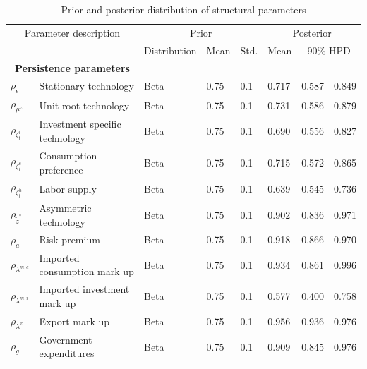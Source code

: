 \documentclass[12pt,oneside,a4paper]{article}
\begin{document}
\begin{table}[H]
\centering
\caption{Prior and posterior distribution of structural parameters}
\label{table:prior_posterior_structural_shocks}
\begin{tabular}{llllllll}
\hline
\multicolumn{2}{c}{Parameter description}                            & \multicolumn{3}{c}{Prior} & \multicolumn{3}{c}{Posterior}         \\
                &                                        & Distribution    & Mean    & Std.    & Mean    & \multicolumn{2}{c}{90\% HPD}  \\
\hline       
\multicolumn{2}{c}{\textbf{Persistence parameters}}      &                 &         &        &         &           &        \\
$\rho_{\epsilon}$     & Stationary technology                  & Beta            & 0.75    & 0.1    & 0.717  & 0.587    & 0.849 \\
$\rho_{\mu^{z}}$        & Unit root technology                   & Beta            & 0.75    & 0.1    & 0.731  & 0.586    & 0.879 \\
$\rho_{\zeta_{t}^{i}}$           & Investment specific technology         & Beta            & 0.75    & 0.1    & 0.690  & 0.556    & 0.827 \\
$\rho_{\zeta_{t}^{c}}$           & Consumption preference                 & Beta            & 0.75    & 0.1    & 0.715  & 0.572    & 0.865 \\
$\rho_{\zeta_{t}^{h}}$           & Labor supply                           & Beta            & 0.75    & 0.1    & 0.639  & 0.545    & 0.736 \\
$\rho_{\tilde{z}^{*}}$         & Asymmetric technology                  & Beta            & 0.75    & 0.1    & 0.902  & 0.836    & 0.971 \\
$\rho_a$           & Risk premium                           & Beta            & 0.75    & 0.1    & 0.918  & 0.866    & 0.970 \\
$\rho_{\lambda^{m,c}}$    & Imported consumption mark up           & Beta            & 0.75    & 0.1    & 0.934  & 0.861    & 0.996 \\
$\rho_{\lambda^{m,i}}$    & Imported investment mark up            & Beta            & 0.75    & 0.1    & 0.577  & 0.400   & 0.758 \\
$\rho_{\lambda^{x}}$     & Export mark up                         & Beta            & 0.75    & 0.1    & 0.956  & 0.936    & 0.976 \\
$\rho_{g}$         & Government expenditures                 & Beta            & 0.75    & 0.1    & 0.909  & 0.845    & 0.976 \\

\end{tabular}
\end{table}
\end{document}
